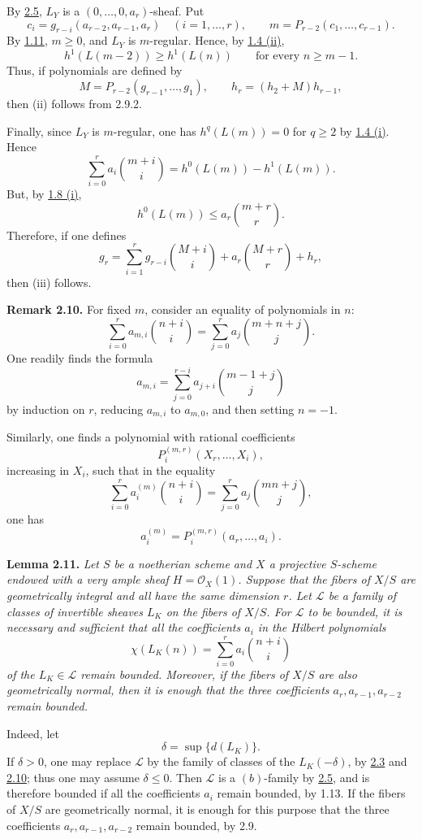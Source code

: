 By \hyperlink{sga6.e13.lem.2-5}{2.5}, \(L_Y\) is a \((0,\ldots,0,a_r)\)-sheaf. Put
\[
c_i=g_{r-i}(a_{r-2},a_{r-1},a_r)
\quad(i=1,\ldots,r),
\qquad
m=P_{r-2}(c_1,\ldots,c_{r-1}).
\]
By \hyperlink{sga6.e13.thm.1-11}{1.11}, \(m\ge0\), and \(L_Y\) is \(m\)-regular. Hence, by \hyperlink{sga6.e13.prop.1-4}{1.4 (ii)},
\[
h^1(L(m-2))\ge h^1(L(n))
\qquad\text{for every }n\ge m-1.
\]
Thus, if polynomials are defined by
\[
M=P_{r-2}(g_{r-1},\ldots,g_1),
\qquad
h_r=(h_2+M)h_{r-1},
\]
then (ii) follows from 2.9.2.

Finally, since \(L_Y\) is \(m\)-regular, one has \(h^q(L(m))=0\) for
\(q\ge2\) by \hyperlink{sga6.e13.prop.1-4}{1.4 (i)}. Hence
\[
\sum_{i=0}^{r}a_i\binom{m+i}{i}
=h^0(L(m))-h^1(L(m)).
\]
But, by \hyperlink{sga6.e13.prop.1-8}{1.8 (i)},
\[
h^0(L(m))\le a_r\binom{m+r}{r}.
\]
Therefore, if one defines
\[
g_r=
\sum_{i=1}^{r}g_{r-i}\binom{M+i}{i}
+a_r\binom{M+r}{r}+h_r,
\]
then (iii) follows.

\textbf{Remark 2.10.} For fixed \(m\), consider an equality of
polynomials in \(n\):
\[
\sum_{i=0}^{r}a_{m,i}\binom{n+i}{i}
=\sum_{j=0}^{r}a_j\binom{m+n+j}{j}.
\]
One readily finds the formula
\[
a_{m,i}=
\sum_{j=0}^{r-i}a_{j+i}\binom{m-1+j}{j}
\]
by induction on \(r\), reducing \(a_{m,i}\) to \(a_{m,0}\), and then
setting \(n=-1\).

Similarly, one finds a polynomial with rational coefficients
\[
P_i^{(m,r)}(X_r,\ldots,X_i),
\]
increasing in \(X_i\), such that in the equality
\[
\sum_{i=0}^{r}a_i^{(m)}\binom{n+i}{i}
=\sum_{j=0}^{r}a_j\binom{mn+j}{j},
\]
one has
\[
a_i^{(m)}=P_i^{(m,r)}(a_r,\ldots,a_i).
\]

\textbf{Lemma 2.11.} \emph{Let \(S\) be a noetherian scheme and \(X\)
a projective \(S\)-scheme endowed with a very ample sheaf
\(H=\mathcal O_X(1)\). Suppose that the fibers of \(X/S\) are
geometrically integral and all have the same dimension \(r\). Let
\(\mathcal L\) be a family of classes of invertible sheaves \(L_K\) on the
fibers of \(X/S\). For \(\mathcal L\) to be bounded, it is necessary and
sufficient that all the coefficients \(a_i\) in the Hilbert polynomials}
\[
\chi(L_K(n))=\sum_{i=0}^{r}a_i\binom{n+i}{i}
\]
\emph{of the \(L_K\in\mathcal L\) remain bounded. Moreover, if the
fibers of \(X/S\) are also geometrically normal, then it is enough that
the three coefficients \(a_r,a_{r-1},a_{r-2}\) remain bounded.}

Indeed, let
\[
\delta=\sup\{d(L_K)\}.
\]
If \(\delta>0\), one may replace \(\mathcal L\) by the family of classes
of the \(L_K(-\delta)\), by \hyperlink{sga6.e13.lem.2-3}{2.3} and \hyperlink{sga6.e13.rem.2-10}{2.10}; thus one may assume
\(\delta\le0\). Then \(\mathcal L\) is a \((b)\)-family by \hyperlink{sga6.e13.lem.2-5}{2.5}, and is
therefore bounded if all the coefficients \(a_i\) remain bounded, by
1.13. If the fibers of \(X/S\) are geometrically normal, it is enough
for this purpose that the three coefficients \(a_r,a_{r-1},a_{r-2}\)
remain bounded, by 2.9.

